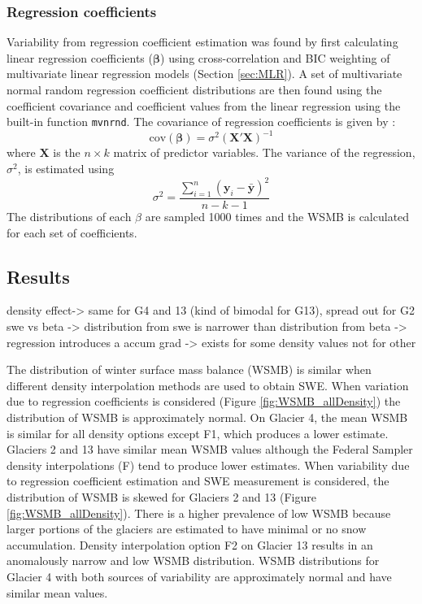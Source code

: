 \documentclass[12pt]{article}
\begin{document}
\subsubsection{Regression coefficients}

Variability from regression coefficient estimation was found by first calculating linear regression coefficients ($\boldsymbol{\beta}$) using cross-correlation and BIC weighting of multivariate linear regression models (Section \ref{sec:MLR}). A set of multivariate normal random regression coefficient distributions are then found using the coefficient covariance and coefficient values from the linear regression using the built-in function \texttt{mvnrnd}. The covariance of regression coefficients is given by \citep{Bagos2015}:
\begin{equation}
\mathrm{cov}\left( \boldsymbol{\beta} \right) = \sigma^2 \left( \boldsymbol{X}'  \boldsymbol{X} \right)^{-1}
\end{equation}
where $\boldsymbol{X}$ is the $n \times k$ matrix of predictor variables. The variance of the regression, $\sigma^2$, is estimated using
\begin{equation}
\sigma^2 = \frac{\sum^n_{i=1} \left(\boldsymbol{y}_i-\bar{\boldsymbol{y}} \right)^2}{n-k-1}
\end{equation}
The distributions of each $\beta$ are sampled 1000 times and the WSMB is calculated for each set of coefficients.

\subsection{Results}

density effect-> same for G4 and 13 (kind of bimodal for G13), spread out for G2
swe vs beta -> distribution from swe is narrower than distribution from beta -> regression introduces a 
accum grad -> exists for some density values not for other



The distribution of winter surface mass balance (WSMB) is similar when different density interpolation methods are used to obtain SWE. When variation due to regression coefficients is considered (Figure \ref{fig:WSMB_allDensity}) the distribution of WSMB is approximately normal. On Glacier 4, the mean WSMB is similar for all density options except F1, which produces a lower estimate. Glaciers 2 and 13 have similar mean WSMB values although the Federal Sampler density interpolations (F) tend to produce lower estimates. When variability due to regression coefficient estimation and SWE measurement is considered, the distribution of WSMB is skewed for Glaciers 2 and 13 (Figure \ref{fig:WSMB_allDensity}). There is a higher prevalence of low WSMB because larger portions of the glaciers are estimated to have minimal or no snow accumulation. Density interpolation option F2 on Glacier 13 results in an anomalously narrow and low WSMB distribution. WSMB distributions for Glacier 4 with both sources of variability are approximately normal and have similar mean values. 
\end{document}
